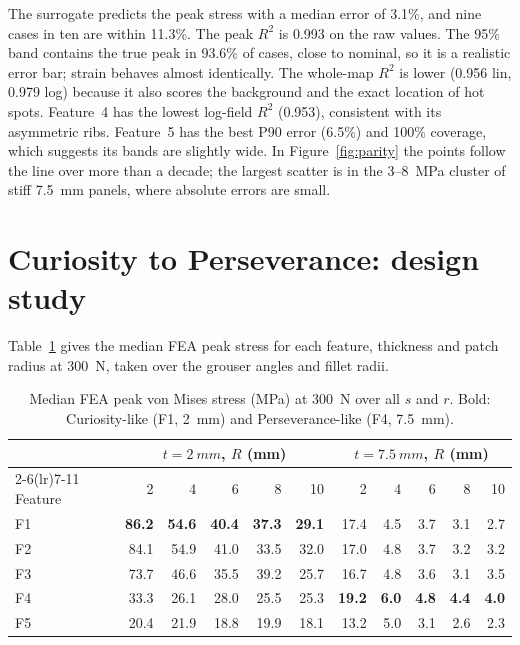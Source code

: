 \documentclass[11pt,a4paper]{article}
\begin{document}
The surrogate predicts the peak stress with a median error of 3.1\%, and nine cases in ten are within 11.3\%. The peak $R^2$ is 0.993 on the raw values. The 95\% band contains the true peak in 93.6\% of cases, close to nominal, so it is a realistic error bar; strain behaves almost identically. The whole-map $R^2$ is lower (0.956 lin, 0.979 log) because it also scores the background and the exact location of hot spots. Feature~4 has the lowest log-field $R^2$ (0.953), consistent with its asymmetric ribs. Feature~5 has the best P90 error (6.5\%) and 100\% coverage, which suggests its bands are slightly wide. In Figure~\ref{fig:parity} the points follow the line over more than a decade; the largest scatter is in the 3--\SI{8}{MPa} cluster of stiff \SI{7.5}{mm} panels, where absolute errors are small.

\section{Curiosity to Perseverance: design study}

Table~\ref{tab:design} gives the median FEA peak stress for each feature, thickness and patch radius at \SI{300}{N}, taken over the grouser angles and fillet radii.

\begin{table}[!htb]
  \centering
  \caption{Median FEA peak von Mises stress (MPa) at \SI{300}{N} over all $s$ and $r$. Bold: Curiosity-like (F1, \SI{2}{mm}) and Perseverance-like (F4, \SI{7.5}{mm}).}
  \label{tab:design}
  \begin{tabular}{l rrrrr rrrrr}
    \toprule
    & \multicolumn{5}{c}{$t = \SI{2}{mm}$, $R$ (mm)} & \multicolumn{5}{c}{$t = \SI{7.5}{mm}$, $R$ (mm)} \\
    \cmidrule(lr){2-6}\cmidrule(lr){7-11}
    Feature & 2 & 4 & 6 & 8 & 10 & 2 & 4 & 6 & 8 & 10 \\
    \midrule
    F1 & \textbf{86.2} & \textbf{54.6} & \textbf{40.4} & \textbf{37.3} & \textbf{29.1} & 17.4 & 4.5 & 3.7 & 3.1 & 2.7 \\
    F2 & 84.1 & 54.9 & 41.0 & 33.5 & 32.0 & 17.0 & 4.8 & 3.7 & 3.2 & 3.2 \\
    F3 & 73.7 & 46.6 & 35.5 & 39.2 & 25.7 & 16.7 & 4.8 & 3.6 & 3.1 & 3.5 \\
    F4 & 33.3 & 26.1 & 28.0 & 25.5 & 25.3 & \textbf{19.2} & \textbf{6.0} & \textbf{4.8} & \textbf{4.4} & \textbf{4.0} \\
    F5 & 20.4 & 21.9 & 18.8 & 19.9 & 18.1 & 13.2 & 5.0 & 3.1 & 2.6 & 2.3 \\
    \bottomrule
  \end{tabular}
\end{table}
\end{document}
